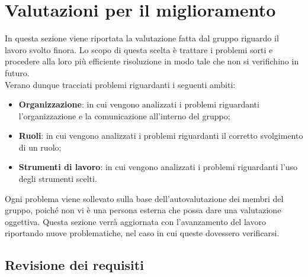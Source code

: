 \section{Valutazioni per il miglioramento}
In questa sezione viene riportata la valutazione fatta dal gruppo riguardo il 
lavoro svolto finora. Lo scopo di questa scelta è trattare i problemi sorti e
procedere alla loro più efficiente risoluzione in modo tale che non si verifichino
in futuro. \\
Verano dunque tracciati problemi riguardanti i seguenti ambiti:

\begin{itemize}
	\item \textbf{Organizzazione}: in cui vengono analizzati i problemi riguardanti 
		l'organizzazione e la comunicazione all'interno del gruppo;
	\item \textbf{Ruoli}: in cui vengono analizzati i problemi riguardanti il 
		corretto svolgimento di un ruolo;
	\item \textbf{Strumenti di lavoro}: in cui vengono analizzati i problemi riguardanti 
		l'uso degli strumenti scelti.
\end{itemize}

\noindent Ogni problema viene sollevato sulla base dell'autovalutazione dei membri del 
gruppo, poiché non vi è una persona esterna che possa dare una valutazione
oggettiva. 
Questa sezione verrà aggiornata con l'avanzamento del lavoro riportando nuove 
problematiche, nel caso in cui queste dovessero verificarsi.

\subsection{Revisione dei requisiti}

